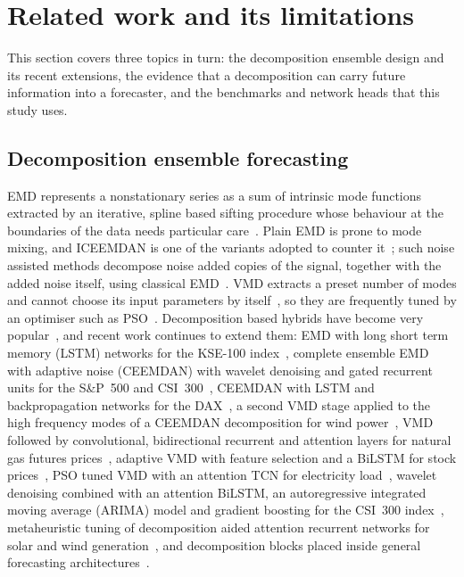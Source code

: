 \section{Related work and its limitations}\label{sec:related}

This section covers three topics in turn: the decomposition ensemble design
and its recent extensions, the evidence that a decomposition can carry future
information into a forecaster, and the benchmarks and network heads that this
study uses.

\subsection{Decomposition ensemble forecasting}
EMD represents a nonstationary series as a sum of intrinsic mode functions
extracted by an iterative, spline based sifting procedure whose behaviour at
the boundaries of the data needs particular care~\cite{emdtutorial2023}. Plain
EMD is prone to mode mixing, and ICEEMDAN is one of the variants adopted to
counter it~\cite{iceemdanbridge2022}; such noise assisted methods decompose
noise added copies of the signal, together with the added noise itself, using
classical EMD~\cite{ceemdanpaa2022}. VMD extracts a preset number of modes and
cannot choose its input parameters by itself~\cite{vmdmssr2022}, so they are
frequently tuned by an optimiser such as PSO~\cite{psovmdtcn2023}.
Decomposition based hybrids have become very popular~\cite{chen2022}, and
recent work continues to extend them: EMD with long short term memory (LSTM)
networks for the KSE-100 index~\cite{akimaemd2023}, complete ensemble EMD with
adaptive noise (CEEMDAN) with wavelet denoising and gated recurrent units for
the S\&P~500 and CSI~300~\cite{gruceemdan2023}, CEEMDAN with LSTM and
backpropagation networks for the DAX~\cite{ceemdanstock2025}, a second VMD
stage applied to the high frequency modes of a CEEMDAN decomposition for wind
power~\cite{ning2025}, VMD followed by convolutional, bidirectional recurrent
and attention layers for natural gas futures prices~\cite{jiang2025}, adaptive
VMD with feature selection and a BiLSTM for stock prices~\cite{wangwang2026},
PSO tuned VMD with an attention TCN for electricity load~\cite{psovmdtcn2023},
wavelet denoising combined with an attention BiLSTM, an autoregressive
integrated moving average (ARIMA) model and gradient boosting for the CSI~300
index~\cite{zhao2025}, metaheuristic tuning of decomposition aided attention
recurrent networks for solar and wind generation~\cite{damasevicius2024}, and
decomposition blocks placed inside general forecasting
architectures~\cite{kreuzer2025}.

